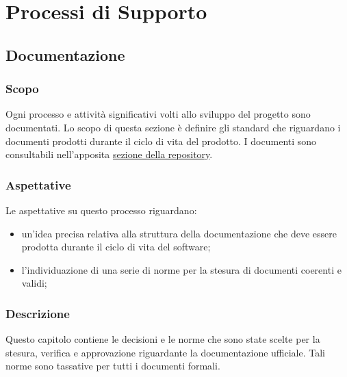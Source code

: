 \section{Processi di Supporto}
\subsection{Documentazione}
	\subsubsection{Scopo}
	Ogni processo e attività significativi volti allo sviluppo del progetto sono documentati. Lo scopo di questa sezione è definire gli standard che riguardano i documenti prodotti durante il ciclo di vita del prodotto.
	I documenti sono consultabili nell'apposita  \href{https://github.com/8LabSolutions/Soldino}{sezione della repository}. 		
	\subsubsection{Aspettative}
	Le aspettative su questo processo riguardano:
	\begin{itemize}
		\item un'idea precisa relativa alla struttura della documentazione che deve essere prodotta durante il ciclo di vita del software;
		\item l'individuazione di una serie di norme per la stesura di documenti coerenti e validi;
	\end{itemize}
	\subsubsection{Descrizione}
	Questo capitolo contiene le decisioni e le norme che sono state scelte per la
	stesura, verifica e approvazione riguardante la documentazione ufficiale.  Tali norme  sono  tassative  per  tutti  i  documenti  formali.
